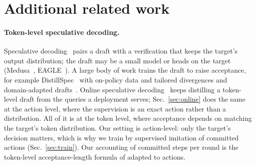 \section{Additional related work}
\label{app:related}
\paragraph{Token-level speculative decoding.}
Speculative decoding~\citep{leviathan2023,chen2023} pairs a draft with a verification that keeps the target's output distribution; the draft
may be a small model or heads on the target (Medusa~\citep{medusa}, EAGLE~\citep{eagle}). A large body of
work trains the draft to raise acceptance, for example DistillSpec~\citep{distillspec} with on-policy
data and tailored divergences and domain-adapted drafts~\citep{domaindraft}. Online speculative
decoding~\citep{osd} keeps distilling a token-level draft from the queries a deployment serves; Sec.~\ref{sec:online}
does the same at the action level, where the supervision is an exact action rather than a distribution. All of it is at the token
level, where acceptance depends on matching the target's token distribution. Our setting is action-level:
only the target's decision matters, which is why we train by supervised imitation of committed actions
(Sec.~\ref{sec:train}). Our accounting of committed steps per round is the
token-level acceptance-length formula of \citet{leviathan2023} adapted to actions.

